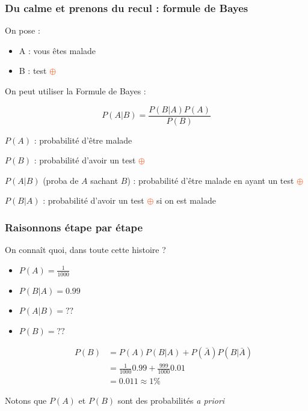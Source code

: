 \documentclass[usenames, dvipsnames]{beamer}
\newcommand{\positif}{\textcolor{OrangeRed}{$\oplus$} }
\begin{document}
\begin{frame}[plain]
\frametitle{Du calme et prenons du recul : formule de Bayes}

\pause

On pose :

\begin{itemize}
\item A : vous êtes malade
\item B : test \positif
\end{itemize}

\pause

On peut utiliser la \alert{Formule de Bayes} :

\[
P(A|B) = \frac{P(B|A)P(A)}{P(B)}
\]

\pause
$P(A)$ : probabilité d'être malade

$P(B)$ : probabilité d'avoir un test \positif\pause

$P(A|B)$ (proba de $A$ sachant $B$) : probabilité d'être malade en ayant un test \positif\pause

$P(B|A)$ : probabilité d'avoir un test \positif si on est malade %

\end{frame}

\begin{frame}[plain]
\frametitle{Raisonnons étape par étape}

On connaît quoi, dans toute cette histoire ?

\begin{itemize}
\item $P(A) = \frac{1}{1000}$ \pause
\item $P(B|A) = 0.99$ \pause
\item $P(A|B) = ??$ \pause
\item $P(B) = ??$ \pause

\begin{align*}P(B) &= P(A)P(B|A) + P(\bar{A})P(B|\bar{A})\\
&=\frac{1}{1000}0.99 + \frac{999}{1000}0.01\\
&= 0.011 \approx 1\%\end{align*}

\end{itemize}

Notons que $P(A)$ et $P(B)$ sont des probabilités \textit{a priori}

\end{frame}
\end{document}
